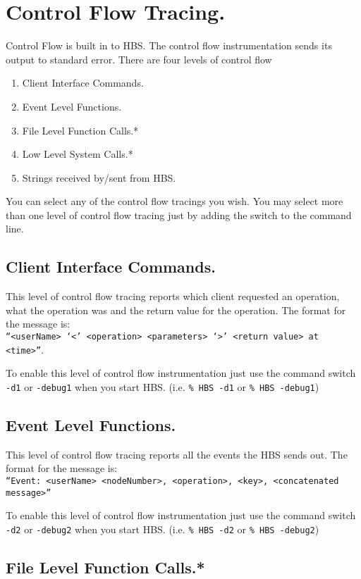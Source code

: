 \section{Control Flow Tracing.}
Control Flow is built in to HBS. The control flow instrumentation sends its
output to standard error.  There are four levels of control flow
\begin{enumerate}
\item{Client Interface Commands.}
\item{Event Level Functions.}
\item{File Level Function Calls.*}
\item{Low Level System Calls.*}
\item{Strings received by/sent from HBS.}
\end{enumerate}
You can select any of the control flow tracings you wish.  You may select
more than one level of control flow tracing just by adding the switch to
the command line.

\subsection{Client Interface Commands.}
This level of control flow tracing reports which client requested an
operation, what the operation was and the return value for the operation.
The format for the message is: \\ {\tt ``<userName> `<'  <operation>
<parameters> `>' <return value> at <time>''}.

To enable this level of control flow instrumentation just use the command
switch {\tt -d1} or {\tt -debug1}  when you start HBS. (i.e. {\tt \% HBS
-d1} or {\tt \% HBS -debug1})
\subsection{Event Level Functions.}
This level of control flow tracing reports all the events the HBS sends
out.  The format for the message is: \\  {\tt ``Event: <userName> <nodeNumber>,
<operation>, <key>, <concatenated message>''}

To enable this level of control flow instrumentation just use the command
switch {\tt -d2} or {\tt -debug2}  when you start HBS. (i.e. {\tt \% HBS
-d2} or {\tt \% HBS -debug2})
\subsection{File Level Function Calls.*}

